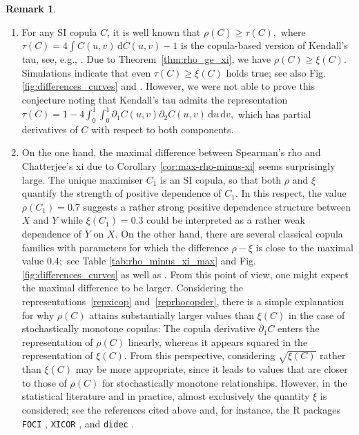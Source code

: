 \documentclass{article}
\theoremstyle{plain}
\theoremstyle{definition}
\newtheorem{remark}{Remark}
\newcommand{\de}{\mathrm{\,d}}
\begin{document}
\begin{remark}
\begin{enumerate}[label=(\alph*)]
    For the proof of Theorem~\ref{thm:rho_ge_xi}, we use a maximum principle and show that the difference \(\rho(C)-\xi(C)\) over all SI copulas is minimal for the extreme cases of independence and perfect positive dependence. These cases correspond to the copulas \(C = \Pi\) and \(C= M,\) respectively, for which the difference vanishes.
    \item For any SI copula \(C\), it is well known that \(\rho(C) \geq \tau(C) ,\) where \(\tau(C) = 4 \int C(u,v) \de C(u,v) - 1\) is the copula-based version of Kendall's tau, see, e.g., \cite[Theorem~5.2.8]{Nelsen-2006}. Due to Theorem~\ref{thm:rho_ge_xi}, we have \(\rho(C) \geq \xi(C).\) Simulations indicate that even \(\tau(C)\geq \xi(C)\) holds true; see also Fig. \ref{fig:differences_curves} and \cite{Ansari-Rockel-2023}. However, we were not able to prove this conjecture noting that Kendall's tau admits the representation \(\tau(C)= 1 - 4 \int_0^1\int_0^1 \partial_1 C(u,v) \partial_2 C(u,v) \de u\de v,\) which has partial derivatives of \(C\) with respect to both components.
    \item On the one hand, the maximal difference between Spearman's rho and Chatterjee's xi due to Corollary \ref{cor:max-rho-minus-xi} seems surprisingly large.
    The unique maximiser \(C_1\) is an SI copula, so that both \(\rho\) and \(\xi\) quantify the strength of positive dependence of \(C_1.\)
    In this respect, the value \(\rho(C_1) = 0.7\) suggests a rather strong positive dependence structure between \(X\) and \(Y\) while \(\xi(C_1) = 0.3\) could be interpreted as a rather weak dependence of \(Y\) on \(X.\)
    On the other hand, there are several classical copula families with parameters for which the difference \(\rho-\xi\) is close to the maximal value \(0.4;\) see Table \ref{tab:rho_minus_xi_max} and Fig. \ref{fig:differences_curves} as well as \cite{Ansari-Rockel-2023}.
    From this point of view, one might expect the maximal difference to be larger.
    Considering the representations~\eqref{repxicop} and~\eqref{reprhocopder}, there is a simple explanation for why \(\rho(C)\) attains substantially larger values than \(\xi(C)\) in the case of stochastically monotone copulas:
The copula derivative \(\partial_1 C\) enters the representation of \(\rho(C)\) linearly, whereas it appears squared in the representation of \(\xi(C)\).
From this perspective, considering \(\sqrt{\xi(C)}\) rather than \(\xi(C)\) may be more appropriate, since it leads to values that are closer to those of \(\rho(C)\) for stochastically monotone relationships.
However, in the statistical literature and in practice, almost exclusively the quantity \(\xi\) is considered; see the references cited above and, for instance, the \textsf{R} packages \texttt{FOCI} \cite{FOCI}, \texttt{XICOR} \cite{XICOR}, and \texttt{didec} \cite{didec}.

\end{enumerate}
\end{remark}
\end{document}
